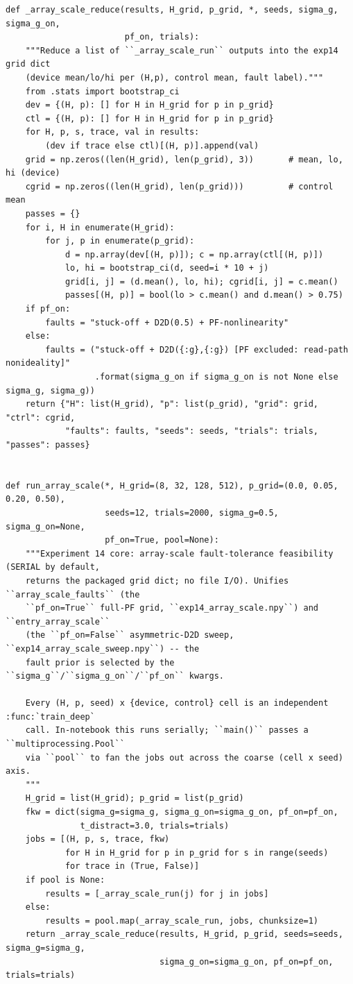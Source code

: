 \begin{lstlisting}[caption={mrl\_trace/deep.py},label={lst:siox-src-deep}]
def _array_scale_reduce(results, H_grid, p_grid, *, seeds, sigma_g, sigma_g_on,
                        pf_on, trials):
    """Reduce a list of ``_array_scale_run`` outputs into the exp14 grid dict
    (device mean/lo/hi per (H,p), control mean, fault label)."""
    from .stats import bootstrap_ci
    dev = {(H, p): [] for H in H_grid for p in p_grid}
    ctl = {(H, p): [] for H in H_grid for p in p_grid}
    for H, p, s, trace, val in results:
        (dev if trace else ctl)[(H, p)].append(val)
    grid = np.zeros((len(H_grid), len(p_grid), 3))       # mean, lo, hi (device)
    cgrid = np.zeros((len(H_grid), len(p_grid)))         # control mean
    passes = {}
    for i, H in enumerate(H_grid):
        for j, p in enumerate(p_grid):
            d = np.array(dev[(H, p)]); c = np.array(ctl[(H, p)])
            lo, hi = bootstrap_ci(d, seed=i * 10 + j)
            grid[i, j] = (d.mean(), lo, hi); cgrid[i, j] = c.mean()
            passes[(H, p)] = bool(lo > c.mean() and d.mean() > 0.75)
    if pf_on:
        faults = "stuck-off + D2D(0.5) + PF-nonlinearity"
    else:
        faults = ("stuck-off + D2D({:g},{:g}) [PF excluded: read-path nonideality]"
                  .format(sigma_g_on if sigma_g_on is not None else sigma_g, sigma_g))
    return {"H": list(H_grid), "p": list(p_grid), "grid": grid, "ctrl": cgrid,
            "faults": faults, "seeds": seeds, "trials": trials, "passes": passes}


def run_array_scale(*, H_grid=(8, 32, 128, 512), p_grid=(0.0, 0.05, 0.20, 0.50),
                    seeds=12, trials=2000, sigma_g=0.5, sigma_g_on=None,
                    pf_on=True, pool=None):
    """Experiment 14 core: array-scale fault-tolerance feasibility (SERIAL by default,
    returns the packaged grid dict; no file I/O). Unifies ``array_scale_faults`` (the
    ``pf_on=True`` full-PF grid, ``exp14_array_scale.npy``) and ``entry_array_scale``
    (the ``pf_on=False`` asymmetric-D2D sweep, ``exp14_array_scale_sweep.npy``) -- the
    fault prior is selected by the ``sigma_g``/``sigma_g_on``/``pf_on`` kwargs.

    Every (H, p, seed) x {device, control} cell is an independent :func:`train_deep`
    call. In-notebook this runs serially; ``main()`` passes a ``multiprocessing.Pool``
    via ``pool`` to fan the jobs out across the coarse (cell x seed) axis.
    """
    H_grid = list(H_grid); p_grid = list(p_grid)
    fkw = dict(sigma_g=sigma_g, sigma_g_on=sigma_g_on, pf_on=pf_on,
               t_distract=3.0, trials=trials)
    jobs = [(H, p, s, trace, fkw)
            for H in H_grid for p in p_grid for s in range(seeds)
            for trace in (True, False)]
    if pool is None:
        results = [_array_scale_run(j) for j in jobs]
    else:
        results = pool.map(_array_scale_run, jobs, chunksize=1)
    return _array_scale_reduce(results, H_grid, p_grid, seeds=seeds, sigma_g=sigma_g,
                               sigma_g_on=sigma_g_on, pf_on=pf_on, trials=trials)



\end{lstlisting}
